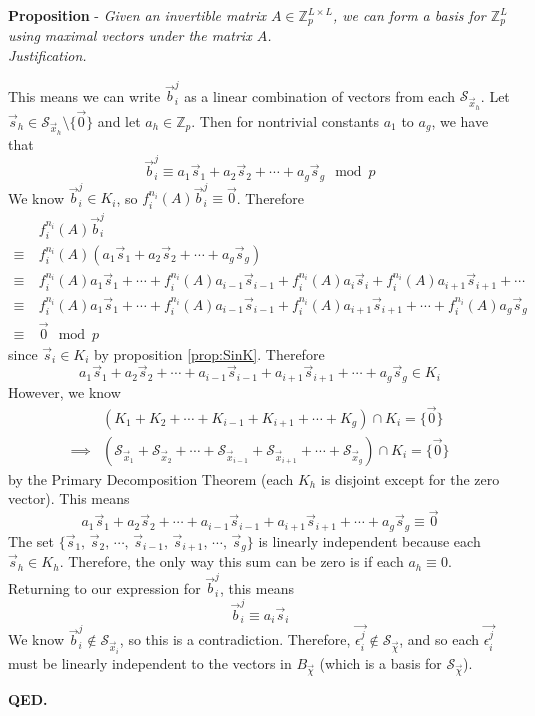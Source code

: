 \documentclass[a4paper, 12pt, reqno]{amsart}
\newcounter{propcounter}
\newenvironment{proposition}[1]
{
	\refstepcounter{propcounter}
	\textbf{Proposition \thepropcounter} - \emph{#1} \\
	\emph{Justification.}
}
{
	\textbf{QED.} \\
}
\begin{document}
\begin{proposition}{Given an invertible matrix $A \in \mathds{Z}_p^{L \times L}$, we can form a basis for $\mathds{Z}_p^L$ using maximal vectors under the matrix 
		$A$.}
			This means we can write $\vec{b}_i^j$ as a linear combination of vectors from each $\mathcal{S}_{\vec{x}_h}$. Let 
			$\vec{s}_h \in \mathcal{S}_{\vec{x}_h} \setminus \{\vec{0}\}$ and let $a_h \in \mathds{Z}_p$. Then for nontrivial constants $a_1$ to $a_g$, we have that
			\[
				\vec{b}_i^j \equiv a_1\vec{s}_1 + a_2\vec{s}_2 + \cdots + a_g\vec{s}_g \mod{p}
			\]
			We know $\vec{b}_i^j \in K_i$, so $f_i^{n_i}(A)\vec{b}_i^j \equiv \vec{0}$. Therefore
			\begin{align*}
				      & \ f_i^{n_i}(A)\vec{b}_i^j \\
				\equiv& \ f_i^{n_i}(A)(a_1\vec{s}_1 + a_2\vec{s}_2 + \cdots + a_g\vec{s}_g) \\
				\equiv& \ f_i^{n_i}(A)a_1\vec{s}_1 + \cdots + f_i^{n_i}(A)a_{i-1}\vec{s}_{i-1} + 
						  f_i^{n_i}(A)a_i\vec{s}_i + f_i^{n_i}(A)a_{i+1}\vec{s}_{i+1} + \cdots \\
				\equiv& \ f_i^{n_i}(A)a_1\vec{s}_1 + \cdots + f_i^{n_i}(A)a_{i-1}\vec{s}_{i-1} + 
				          f_i^{n_i}(A)a_{i+1}\vec{s}_{i+1} + \cdots + f_i^{n_i}(A)a_g\vec{s}_g \\
				\equiv& \ \vec{0} \mod{p}
			\end{align*}
			since $\vec{s}_i \in K_i$ by proposition \ref{prop:SinK}. Therefore
			\[
				a_1\vec{s}_1 + a_2\vec{s}_2 + \cdots + a_{i-1}\vec{s}_{i-1} + a_{i+1}\vec{s}_{i+1} + \cdots + a_g\vec{s}_g \in K_i
			\]
			However, we know
			\begin{align*}
				        & (K_1 + K_2 + \cdots + K_{i-1} + K_{i+1} + \cdots + K_g) \cap K_i = \{\vec{0}\} \\
				\implies& (\mathcal{S}_{\vec{x}_1} + \mathcal{S}_{\vec{x}_2} + \cdots + \mathcal{S}_{\vec{x}_{i-1}} + \mathcal{S}_{\vec{x}_{i+1}} + 
				           \cdots + \mathcal{S}_{\vec{x}_g}) \cap K_i = \{\vec{0}\}
			\end{align*}
			by the Primary Decomposition Theorem (each $K_h$ is disjoint except for the zero vector). This means
			\[
				a_1\vec{s}_1 + a_2\vec{s}_2 + \cdots + a_{i-1}\vec{s}_{i-1} + a_{i+1}\vec{s}_{i+1} + \cdots + a_g\vec{s}_g \equiv \vec{0}
			\]
			The set $\{\vec{s}_1,\, \vec{s}_2,\, \cdots,\, \vec{s}_{i-1},\, \vec{s}_{i+1},\, \cdots,\, \vec{s}_g\}$ is linearly independent because each $\vec{s}_h \in K_h$.
			Therefore, the only way this sum can be zero is if each $a_h \equiv 0$. Returning to our expression for $\vec{b}_i^j$, this means
			\[
				\vec{b}_i^j \equiv a_i\vec{s}_i
			\]
			We know $\vec{b}_i^j \not\in \mathcal{S}_{\vec{x}_i}$, so this is a contradiction. Therefore, $\vec{\epsilon_i^j} \not\in \mathcal{S}_{\vec{\chi}}$, and so each 
			$\vec{\epsilon_i^j}$ must be linearly independent to the vectors in $B_{\vec{\chi}}$ (which is a basis for $\mathcal{S}_{\vec{\chi}}$).
			

\end{proposition}
\end{document}
